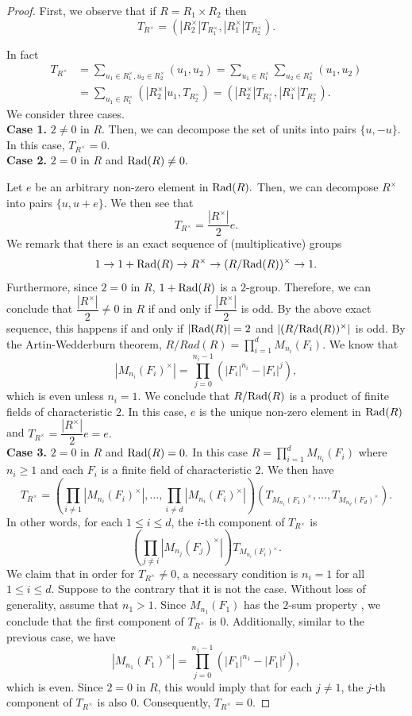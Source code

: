 \documentclass[11pt, a4paper]{amsart}
\theoremstyle{definition}
\numberwithin{equation}{section}
\newcommand{\Rad}{{\rm Rad}}
\begin{document}
\begin{proof}
First, we observe that if $R=R_1 \times R_2$ then 
\[ T_{R^{\times}} = (|R_2^{\times}| T_{R_{1}^\times}, |R_1^{\times}| T_{R_2^{\times}}).\]

In fact 
\begin{align*}
T_{R^{\times}} &= \sum_{u_1 \in R_1^{\times}, u_2 \in R_2^{\times}} (u_1, u_2) = \sum_{u_1 \in R_1^{\times}} \sum_{u_2 \in R_2^{\times}}(u_1, u_2)\\ 
&= \sum_{u_1 \in R_1^{\times}}(|R_2^{\times}| u_1, T_{R_2^{\times}}) =(|R_2^{\times}| T_{R_{1}^\times}, |R_1^{\times}| T_{R_2^{\times}}). 
\end{align*}
We consider three cases. \\
\textbf{Case 1.} $2 \neq 0$ in $R.$ Then, we can decompose the set of units into pairs $\{u, -u\}.$ In this case, $T_{R^{\times}}=0.$  \\
\textbf{Case 2.} $2=0$ in $R$ and $\Rad(R) \neq 0.$ 

Let $e$ be an arbitrary non-zero element in  $\Rad(R).$ Then, we can decompose $R^{\times}$ into pairs $\{u, u+e\}.$ We then see that 
\[ T_{R^{\times}} = \frac{|R^{\times}|}{2}e.\]
We remark that there is an exact sequence of (multiplicative)  groups
\[ 1 \to 1+ \Rad(R) \to R^{\times} \to (R/\Rad(R))^{\times} \to 1. \]
Furthermore, since $2=0$ in $R$, $1+\Rad(R)$ is a $2$-group. Therefore, we can conclude that $\dfrac{|R^{\times}|}{2} \neq 0$ in $R$ if and only if $\dfrac{|R^{\times}|}{2}$ is odd. By the above exact sequence, this happens if and only if $|\Rad(R)|=2$ and $|(R/\Rad(R))^{\times}|$ is odd. By the Artin-Wedderburn theorem, $R/Rad(R)=\prod_{i=1}^d M_{n_i}(F_i)$. We know that 
\[|M_{n_i}(F_i)^{\times}| = \prod_{j=0}^{n_i-1}(|F_i|^{n_i}-|F_i|^j), \]
which is even unless $n_i=1.$ We conclude that $R/\Rad(R)$ is a product of finite fields of characteristic $2.$ In this case, $e$ is the unique non-zero element in $\Rad(R)$ and $T_{R^{\times}}=\dfrac{|R^{\times}|}{2}e=e.$\\
\textbf{Case 3.} $2=0$ in $R$ and $\Rad(R)=0.$ In this case $R=\prod_{i=1}^d M_{n_i}(F_i)$ where $n_i \geq 1$ and each $F_i$ is a finite field of characteristic $2.$ We then have 
\[ T_{R^{\times}} = \left( \prod_{i \neq 1} |M_{n_i}(F_i)^{\times}|, \ldots, \prod_{i \neq d}|M_{n_i}(F_i)^{\times}| \right) (T_{M_{n_1}(F_1)^{\times}}, \ldots, T_{M_{n_d}(F_d)^{\times}}).\]
In other words, for each \(1\leq i\leq d\), the \(i\)-th component of \(T_{R^\times}\) is
\[
\left(\prod_{j\neq i}|M_{n_j}(F_j)^\times|\right)
T_{M_{n_i}(F_i)^\times}.
\]
We claim that in order for $T_{R^{\times}} \neq 0$, a necessary condition is $n_i=1$ for all $1 \leq i \leq d.$ Suppose to the contrary that it is not the case. Without loss of generality, assume that $n_1>1.$ Since $M_{n_1}(F_1)$ has the $2$-sum property , we conclude that the first component of \(T_{R^\times}\) is $0.$ Additionally, similar to the previous case, we have 
\[|M_{n_1}(F_1)^{\times}| = \prod_{j=0}^{n_1-1}(|F_1|^{n_1}-|F_1|^j), \]
which is even. Since $2=0$ in $R$, this would imply that for each $j \neq 1$, the $j$-th component of $T_{R^{\times}}$ is also $0.$ Consequently, $T_{R^{\times}}=0.$ 



\end{proof}
\end{document}
